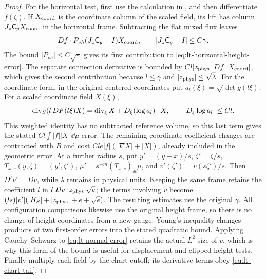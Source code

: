 \begin{proof}
For the horizontal test, first use the calculation in
, and then differentiate $f(\zeta)$.
If $X_{\rm coord}$ is the coordinate column of the scaled field, its lift
has column $J_z\mathsf C_yX_{\rm coord}$ in the horizontal frame.  Subtracting
the flat mixed flux leaves
\[
 Df\cdot P_{vh}(J_z\mathsf C_y-I)X_{\rm coord},
 \qquad |J_z\mathsf C_y-I|\le C\gamma.
\]
The bound $|P_{vh}|\le C\sqrt e$ gives its first contribution to
\eqref{eq:lt-horizontal-height-error}.  The separate connection derivative
is bounded by $Cl|z_{\rm phys}||Df||X_{\rm coord}|$, which gives the second
contribution because $l\le\gamma$ and $|z_{\rm phys}|\le\sqrt\lambda$.
For the coordinate form, in the original centered coordinates put
$a_l(\xi)=\sqrt{\det g(l\xi)}$.  For a scaled coordinate field $X(\xi)$,
\[
 \operatorname{div}_S(l\,DF(l\xi)X)=\operatorname{div}_\xi X+D_\xi(\log a_l)\cdot X,
 \qquad |D_\xi\log a_l|\le Cl.
\]
This weighted identity has no subtracted reference volume, so this
last term gives the stated $Cl\int|f||X|\,\dd\mu$ error.  The remaining
coordinate coefficient changes are contracted with $B$ and cost
$Cl e|f|(|\nabla X|+|X|)$, already included in the geometric error.
At a further radius $s$, put $y'=(y-x)/s$, $\zeta'=\zeta/s$,
$T_{x,s}(y,\zeta)=(y',\zeta')$, $\mu'=s^{-m}(T_{x,s})_\#\mu$, and
$v'(\zeta')=v(s\zeta')/s$.  Then $D'v'=Dv$, while $\lambda$ remains in
physical units.  Keeping the same frame retains the coefficient $l$ in
$l|Dv||z_{\rm phys}|\sqrt e$; the terms involving $v$ become
$(ls)|v'|(|H_S|+|z_{\rm phys}|+e+\sqrt e)$.
The resulting estimates use the original $\gamma$.  All configuration
comparisons likewise use the original height frame, so there is no change
of height coordinates from a new gauge.
Young's inequality changes products of two first-order errors into the
stated quadratic bound.  Applying Cauchy--Schwarz to
\eqref{eq:lt-normal-error} retains the actual $L^2$ size of $v$, which is
why this form of the bound is useful for displacement and clipped-height
tests.  Finally multiply each field by the chart cutoff; its derivative
terms obey \eqref{eq:lt-chart-tail}.
\end{proof}
